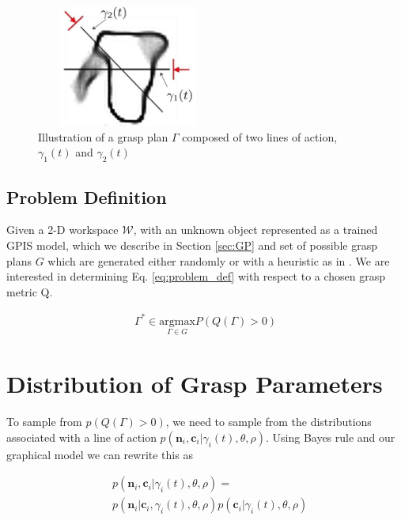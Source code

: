 \documentclass[letterpaper, 10 pt, conference]{ieeeconf}  %
\begin{document}
\begin{figure}[ht!]
\centering
\includegraphics[width = 6cm, height = 4cm]{figures/Slide01.jpg}
\caption{Illustration of a grasp plan $\Gamma$ composed of two lines of action, $\gamma_1(t)$ and $\gamma_2(t)$}
\vspace*{-10pt}
\label{fig:line_of_action}
\end{figure}


\subsection{Problem Definition}

Given a 2-D workspace $\mathcal{W}$, with an unknown object represented as a trained GPIS model, which we describe in Section \ref{sec:GP} and set of possible grasp plans $G$ which are generated either randomly or with a heuristic as in \cite{mahler2015gp}.
We are interested in determining Eq. \ref{eq:problem_def} with respect to a chosen grasp metric Q. 

\vspace{-2ex}
\begin{align}\label{eq:problem_def}
\Gamma^* \in \underset{\Gamma \in G}{\mbox{argmax}} P(Q(\Gamma)>0)
\end{align}

\section{Distribution of Grasp Parameters}
\label{sec:distgrasp}
 
 To sample from $p(Q(\Gamma)>0)$, we need to sample from the distributions associated with a line of action $p(\textbf{n}_i,\textbf{c}_i|\gamma_i(t),\theta, \rho)$. Using Bayes rule and our graphical model we can rewrite this as 
 
 \vspace{-2ex}
 \begin{align*}
 &p(\textbf{n}_i,\textbf{c}_i |\gamma_i(t),\theta,\rho)=\\
 &p(\textbf{n}_i|\textbf{c}_i,\gamma_i(t),\theta,\rho)p(\textbf{c}_i|\gamma_i(t),\theta,\rho)
 \end{align*}
 
\end{document}
